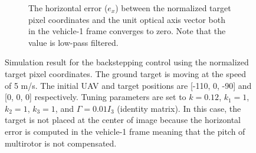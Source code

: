 \begin{figure}[htbp]
\begin{subfigure}[t]{0.8\linewidth}
		\caption{The horizontal error ($e_x$) between the normalized target pixel coordinates and the unit optical axis vector both in the vehicle-1 frame converges to zero. Note that the value is low-pass filtered.}
	\end{subfigure}	
	\caption[Simulation result for the backstepping control using the normalized target pixel coordinates.]{Simulation result for the backstepping control using the normalized target pixel coordinates. The ground target is moving at the speed of 5 m/s. The initial UAV and target positions are [-110, 0, -90] and [0, 0, 0] respectively. Tuning parameters are set to $k=0.12$, $k_1=1$, $k_2=1$, $k_3=1$, and $\Gamma=0.01I_3$ (identity matrix). In this case, the target is not placed at the center of image because the horizontal error is computed in the vehicle-1 frame meaning that the pitch of multirotor is not compensated.}
	\label{image_5mps}
\end{figure}

